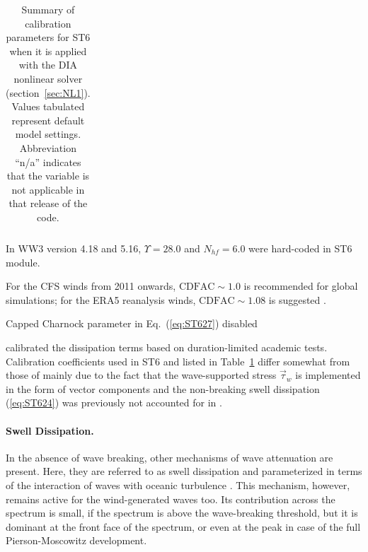 \begin{table}
\begin{center}
\begin{threeparttable}
\begin{tabular}{|l|c|c|c|c|c|c|}
 \hline \hline
\end{tabular}
\begin{tablenotes}
    \item[\textdagger] In WW3 version 4.18 and 5.16, $\Upsilon = 28.0$
            and $N_{hf} = 6.0$ were hard-coded in {\code ST6} module.
    \item[\textdaggerdbl] For the CFS winds from 2011 onwards, $\mathrm{CDFAC} \sim 1.0$
            is recommended for global simulations; for the ERA5 reanalysis winds,
            $\mathrm{CDFAC} \sim 1.08$ is suggested \citep{Liu2019, Liu2021}.
    \item[\S] Capped Charnock parameter in Eq.~(\ref{eq:ST627}) disabled

\end{tablenotes}
\end{threeparttable} \end{center}
\caption{Summary of calibration parameters for {\code ST6} when it is applied with
         the {\code DIA} nonlinear solver (section~\ref{sec:NL1}). Values tabulated represent default model settings.
         Abbreviation ``n/a'' indicates that the variable is not applicable
         in that release of the code.}
\label{tab:ST601} \botline \end{table}

\citet{art:RBW12} calibrated the dissipation terms based on duration-limited
academic tests. Calibration coefficients used in {\code ST6} and listed in
Table~\ref{tab:ST601} differ somewhat from those of \citet{art:RBW12}
mainly due to the fact that the wave-supported stress $\vec{\tau}_w$
is implemented in the form of vector components and the non-breaking swell
dissipation (\ref{eq:ST624}) was previously not accounted for in
\citet{art:RBW12}.

\paragraph{Swell Dissipation.} In the absence of wave breaking,
other mechanisms of wave attenuation are present. Here, they are
referred to as swell dissipation and parameterized in terms of
the interaction of waves with oceanic turbulence \citep{bk:Bab11}.
This mechanism, however, remains active for the wind-generated
waves too. Its contribution across the spectrum is small, if the
spectrum is above the wave-breaking threshold, but it is dominant
at the front face of the spectrum, or even at the peak in case of
the full Pierson-Moscowitz development.

